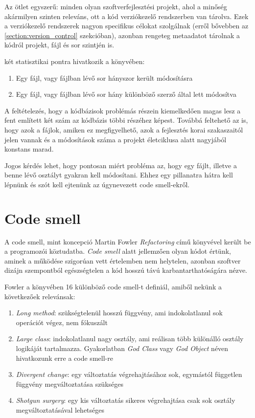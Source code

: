 Az ötlet egyszerű: minden olyan szoftverfejlesztési projekt, ahol a minőség akármilyen szinten releváns, ott a kód verziókezelő rendszerben van tárolva. Ezek a verziókezelő rendszerek nagyon specifikus célokat szolgálnak (erről bővebben az \ref{section:version_control} szekcióban), azonban rengeteg metaadatot tárolnak a kódról projekt, fájl és sor szintjén is.

\citeauthor{tornhillXrays} két statisztikai pontra hivatkozik a könyvében:
\begin{enumerate}
    \item Egy fájl, vagy fájlban lévő sor hányszor került módosításra
    \item Egy fájl, vagy fájlban lévő sor hány különböző szerző által lett módosítva
\end{enumerate}

A feltételezés, hogy a kódbázisok problémás részein kiemelkedően magas lesz a fent említett két szám az kódbázis többi részéhez képest. Továbbá feltehető az is, hogy azok a fájlok, amiken ez megfigyelhető, azok a fejlesztés korai szakaszaitól jelen vannak és a módosítások száma a projekt életciklusa alatt nagyjából konstans marad.

Jogos kérdés lehet, hogy pontosan miért probléma az, hogy egy fájlt, illetve a benne lévő osztályt gyakran kell módosítani. Ehhez egy pillanatra hátra kell lépnünk és szót kell ejtenünk az úgynevezett code smell-ekről.

\section{Code smell}

A code smell, mint koncepció Martin Fowler \textit{Refactoring}\cite{fowlerRefactoring} című könyvével került be a programozói köztudatba. \textit{Code smell} alatt jellemzően olyan kódot értünk, aminek a működése szigorúan vett értelemben nem helytelen, azonban szoftver dizájn szempontból egészségtelen a kód hosszú távú karbantarthatóságára nézve.

Fowler a könyvében 16 különböző code smell-t definiál, amiből nekünk a következőek relevánsak:
\begin{enumerate}
    \item \textit{Long method}: szükségtelenül hosszú függvény, ami indokolatlanul sok operációt végez, nem fókuszált
    \item \textit{Large class}: indokolatlanul nagy osztály, ami reálisan több különálló osztály logikáját tartalmazza. Gyakorlatban \textit{God Class} vagy \textit{God Object} néven hivatkozunk erre a code smell-re
    \item \textit{Divergent change}: egy változtatás végrehajtásához sok, egymástól független függvény megváltoztatása szükséges
    \item \textit{Shotgun surgery}: egy kis változtatás sikeres végrehajtása csak sok osztály megváltoztatásával lehetséges
\end{enumerate}

